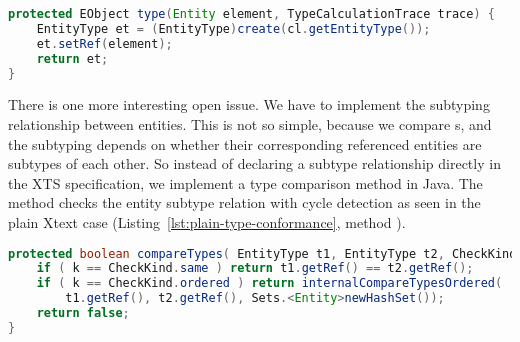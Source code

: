 \begin{lstlisting}[language=Java]
protected EObject type(Entity element, TypeCalculationTrace trace) {
    EntityType et = (EntityType)create(cl.getEntityType());
    et.setRef(element);
    return et;
}
\end{lstlisting}

There is one more interesting open issue. We have to implement the subtyping
relationship between entities. This is not so simple, because we compare
s, and the subtyping depends on whether their corresponding
referenced entities are subtypes of each other. So instead of declaring a subtype relationship directly
in the XTS specification, we implement a type comparison method in Java. The
method  checks the entity subtype
relation with cycle detection as seen in the plain Xtext case
(Listing~\ref{lst:plain-type-conformance}, method
).


\begin{lstlisting}[language=Java]
protected boolean compareTypes( EntityType t1, EntityType t2, CheckKind k, TypeCalculationTrace trace ) {
    if ( k == CheckKind.same ) return t1.getRef() == t2.getRef();
    if ( k == CheckKind.ordered ) return internalCompareTypesOrdered(
        t1.getRef(), t2.getRef(), Sets.<Entity>newHashSet());
    return false; 
}
\end{lstlisting}


  
